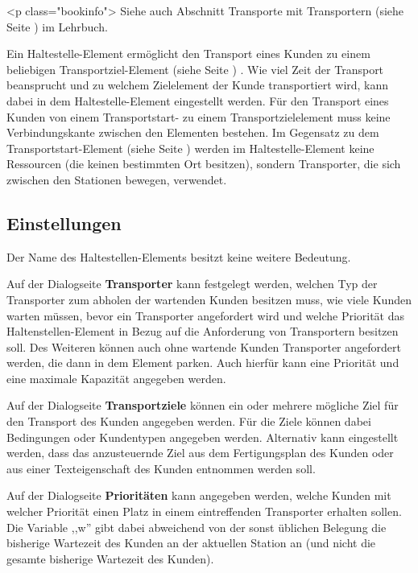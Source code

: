 <p class="bookinfo">
Siehe auch Abschnitt Transporte mit Transportern (siehe Seite \pageref{ref:book:8.3.2}) im Lehrbuch.

Ein Haltestelle-Element ermöglicht den Transport eines Kunden zu einem beliebigen
Transportziel-Element (siehe Seite \pageref{ref:ModelElementTransportDestination}) . Wie viel
Zeit der Transport beansprucht und zu welchem Zielelement der Kunde transportiert
wird, kann dabei in dem Haltestelle-Element eingestellt werden.
Für den Transport eines Kunden von einem Transportstart- zu einem Transportzielelement
muss keine Verbindungskante zwischen den Elementen bestehen.
Im Gegensatz zu dem Transportstart-Element (siehe Seite \pageref{ref:ModelElementTransportSource}) 
werden im Haltestelle-Element keine Ressourcen (die keinen bestimmten Ort besitzen),
sondern Transporter, die sich zwischen den Stationen bewegen, verwendet.

\subsection*{Einstellungen}

Der Name des Haltestellen-Elements besitzt keine weitere Bedeutung.

Auf der Dialogseite \textbf{Transporter} kann festgelegt werden, welchen
Typ der Transporter zum abholen der wartenden Kunden besitzen muss,
wie viele Kunden warten müssen, bevor ein Transporter angefordert wird
und welche Priorität das Haltenstellen-Element in Bezug auf die
Anforderung von Transportern besitzen soll.
Des Weiteren können auch ohne wartende Kunden Transporter angefordert
werden, die dann in dem Element parken. Auch hierfür kann eine Priorität
und eine maximale Kapazität angegeben werden.

Auf der Dialogseite \textbf{Transportziele} können ein oder mehrere
mögliche Ziel für den Transport des Kunden angegeben werden. Für die Ziele können dabei
Bedingungen oder Kundentypen angegeben werden. Alternativ kann eingestellt werden, dass
das anzusteuernde Ziel aus dem Fertigungsplan des Kunden oder aus einer Texteigenschaft
des Kunden entnommen werden soll.

Auf der Dialogseite \textbf{Prioritäten} kann angegeben werden, welche
Kunden mit welcher Priorität einen Platz in einem eintreffenden
Transporter erhalten sollen.
Die Variable ,,w'' gibt dabei abweichend von der sonst üblichen Belegung die bisherige
Wartezeit des Kunden an der aktuellen Station an (und nicht die gesamte bisherige
Wartezeit des Kunden).


